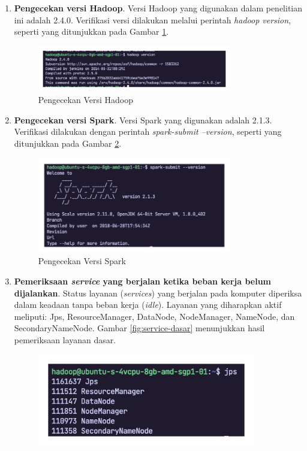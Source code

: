 \begin{enumerate}
	\item \textbf{Pengecekan versi Hadoop}. Versi Hadoop yang digunakan dalam penelitian ini adalah 2.4.0. Verifikasi versi dilakukan melalui perintah \textit{hadoop version}, seperti yang ditunjukkan pada Gambar \ref{fig:versi-hadoop}. 
		\begin{figure}[h]
		    \centering
		    \includegraphics[width=0.8\textwidth]{figures/ch04/versi-hadoop}
		    \caption{Pengecekan Versi Hadoop}
		    \label{fig:versi-hadoop}
		\end{figure}
	\item \textbf{Pengecekan versi Spark}. Versi Spark yang digunakan adalah 2.1.3. Verifikasi dilakukan dengan perintah \textit{spark-submit --version}, seperti yang ditunjukkan pada Gambar \ref{fig:versi-spark}.
		\begin{figure}[h]
		    \centering
		    \includegraphics[width=0.8\textwidth]{figures/ch04/versi-spark}
		    \caption{Pengecekan Versi Spark}
		    \label{fig:versi-spark}
		\end{figure}
	\item \textbf{Pemeriksaan \textit{service} yang berjalan ketika beban kerja belum dijalankan}. Status layanan (\textit{services}) yang berjalan pada komputer diperiksa dalam keadaan tanpa beban kerja (\textit{idle}). Layanan yang diharapkan aktif meliputi: Jps, ResourceManager, DataNode, NodeManager, NameNode, dan SecondaryNameNode. Gambar \ref{fig:service-dasar} menunjukkan hasil pemeriksaan layanan dasar.		
		\begin{figure}[h]
		    \centering
		    \includegraphics[width=0.9\textwidth]{figures/ch04/service-dasar}

\end{figure}
\end{enumerate}
